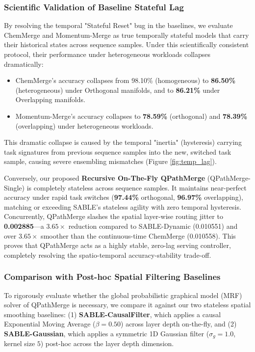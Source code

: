\subsubsection{Scientific Validation of Baseline Stateful Lag}
By resolving the temporal "Stateful Reset" bug in the baselines, we evaluate ChemMerge and Momentum-Merge as true temporally stateful models that carry their historical states across sequence samples. Under this scientifically consistent protocol, their performance under heterogeneous workloads collapses dramatically:
\begin{itemize}
    \item ChemMerge's accuracy collapses from 98.10\% (homogeneous) to \textbf{86.50\%} (heterogeneous) under Orthogonal manifolds, and to \textbf{86.21\%} under Overlapping manifolds.
    \item Momentum-Merge's accuracy collapses to \textbf{78.59\%} (orthogonal) and \textbf{78.39\%} (overlapping) under heterogeneous workloads.
\end{itemize}
This dramatic collapse is caused by the temporal "inertia" (hysteresis) carrying task signatures from previous sequence samples into the new, switched task sample, causing severe ensembling mismatches (Figure \ref{fig:temp_lag}). 

Conversely, our proposed \textbf{Recursive On-The-Fly QPathMerge} (QPathMerge-Single) is completely stateless across sequence samples. It maintains near-perfect accuracy under rapid task switches (\textbf{97.44\%} orthogonal, \textbf{96.97\%} overlapping), matching or exceeding SABLE's stateless agility with zero temporal hysteresis. Concurrently, QPathMerge slashes the spatial layer-wise routing jitter to \textbf{0.002885}---a \textbf{$3.65\times$} reduction compared to SABLE-Dynamic (0.010551) and over \textbf{$3.65\times$} smoother than the continuous-time ChemMerge (0.010558). This proves that QPathMerge acts as a highly stable, zero-lag serving controller, completely resolving the spatio-temporal accuracy-stability trade-off.

\subsubsection{Comparison with Post-hoc Spatial Filtering Baselines}
To rigorously evaluate whether the global probabilistic graphical model (MRF) solver of QPathMerge is necessary, we compare it against our two stateless spatial smoothing baselines: (1) \textbf{SABLE-CausalFilter}, which applies a causal Exponential Moving Average ($\beta=0.50$) across layer depth on-the-fly, and (2) \textbf{SABLE-Gaussian}, which applies a symmetric 1D Gaussian filter ($\sigma_g = 1.0$, kernel size $5$) post-hoc across the layer depth dimension.

